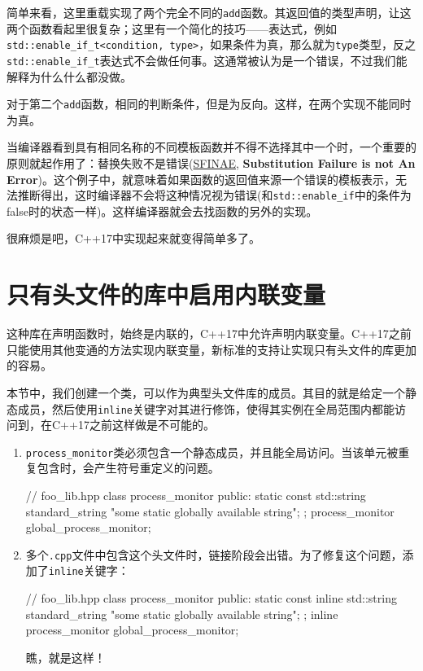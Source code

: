 简单来看，这里重载实现了两个完全不同的\texttt{add}函数。其返回值的类型声明，让这两个函数看起里很复杂；这里有一个简化的技巧——表达式，例如\texttt{std::enable\_if\_t<condition, type>}，如果条件为真，那么就为\texttt{type}类型，反之\texttt{std::enable\_if\_t}表达式不会做任何事。这通常被认为是一个错误，不过我们能解释为什么什么都没做。

对于第二个\texttt{add}函数，相同的判断条件，但是为反向。这样，在两个实现不能同时为真。

当编译器看到具有相同名称的不同模板函数并不得不选择其中一个时，一个重要的原则就起作用了：替换失败不是错误(\href{http://zh.cppreference.com/w/cpp/language/sfinae}{SFINAE}, \textbf{Substitution Failure is not An Error})。这个例子中，就意味着如果函数的返回值来源一个错误的模板表示，无法推断得出，这时编译器不会将这种情况视为错误(和\texttt{std::enable\_if}中的条件为false时的状态一样)。这样编译器就会去找函数的另外的实现。

很麻烦是吧，C++17中实现起来就变得简单多了。


\section{只有头文件的库中启用内联变量}

这种库在声明函数时，始终是内联的，C++17中允许声明内联变量。C++17之前只能使用其他变通的方法实现内联变量，新标准的支持让实现只有头文件的库更加的容易。


本节中，我们创建一个类，可以作为典型头文件库的成员。其目的就是给定一个静态成员，然后使用\texttt{inline}关键字对其进行修饰，使得其实例在全局范围内都能访问到，在C++17之前这样做是不可能的。

\begin{enumerate}
\item \texttt{process\_monitor}类必须包含一个静态成员，并且能全局访问。当该单元被重复包含时，会产生符号重定义的问题。

\begin{codebox}[cpp]
// foo_lib.hpp
class process_monitor {
public:
static const std::string standard_string{
    "some static globally available string"};
};
process_monitor global_process_monitor;
\end{codebox}

\item 多个\texttt{.cpp}文件中包含这个头文件时，链接阶段会出错。为了修复这个问题，添加了\texttt{inline}关键字：

\begin{codebox}[cpp]
// foo_lib.hpp
class process_monitor {
public:
static const inline std::string standard_string{
    "some static globally available string"};
};
inline process_monitor global_process_monitor;
\end{codebox}

瞧，就是这样！

\end{enumerate}

